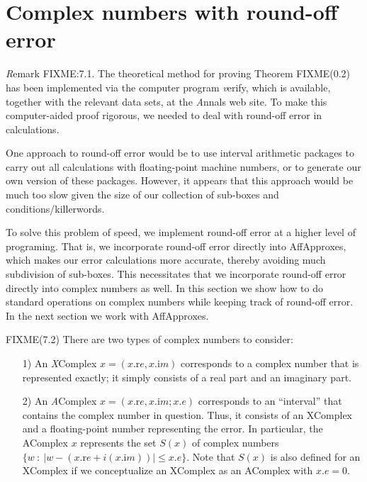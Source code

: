 \section{Complex numbers with round-off error}


{\textit Remark} FIXME:7.1.
The theoretical method for proving Theorem FIXME(0.2)
has been implemented via the computer program {\textit verify}, which is available, together with the relevant data sets, at the {\textit Annals} web site.  To make this computer-aided proof rigorous, we needed to deal with round-off error in calculations.  

One approach to round-off error would be to use interval arithmetic packages to carry out all calculations with floating-point machine numbers, or to generate our own version of these packages.  
However, it appears that this approach
would be much too slow given the size of our collection of sub-boxes and conditions/killerwords.  

To solve this problem of speed, we implement round-off error at a higher level of programing.  That is, we incorporate round-off error directly
 into AffApproxes,  which makes our error calculations more accurate, thereby avoiding much subdivision of
sub-boxes. This necessitates that we incorporate round-off error directly into complex numbers as well. 
In this section we show how to do standard operations on complex numbers while keeping track of round-off error.
In the next section we work with  AffApproxes.

\begin{definition}{ {\textrm FIXME(7.2)}}
There are two types of complex numbers to consider: 

\begin{itemize}
\item[1)]  An {\textit XComplex} $x = (x.{\mathrm re}, x.{\mathrm im})$ corresponds to a complex number that is represented exactly; it
simply consists of a real part and an imaginary part.

\item[2)]  An {\textit AComplex} $x = (x.{\mathrm re}, x.{\mathrm im}; x.e)$ corresponds to an ``interval'' that contains the complex number in
question.  Thus, it consists of an XComplex and a floating-point number representing the error.  In particular, the AComplex
$x$ represents the set $S(x)$ of complex numbers 
$\{w\ :\ |w - (x.{\mathrm re} + i (x.{\mathrm im}))| \le x.e\}$.  Note that $S(x)$ is also defined
for an XComplex if we conceptualize an XComplex as an AComplex with
$x.e = 0.$
\end{itemize}

\end{definition}


